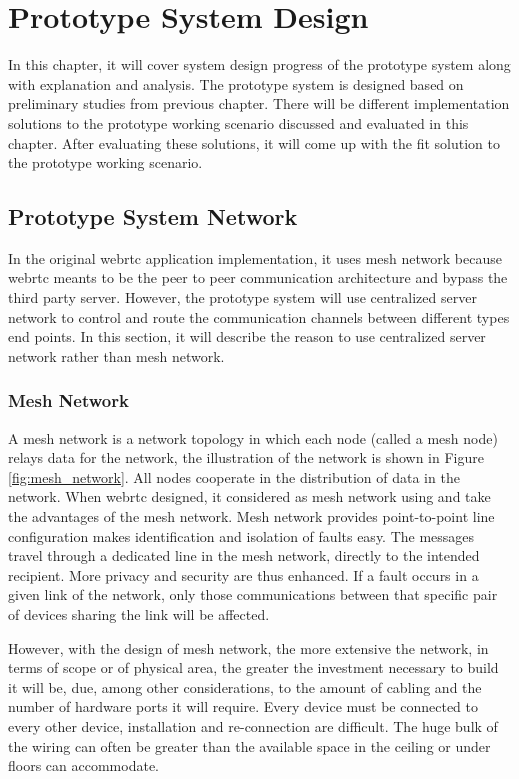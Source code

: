\chapter{Prototype System Design}
\label{chp:sys_design}

\noindent In this chapter, it will cover system design progress of the prototype system along with explanation and analysis. The prototype system is designed based on preliminary studies from previous chapter. There will be different implementation solutions to the prototype working scenario discussed and evaluated in this chapter. After evaluating these solutions, it will come up with the fit solution to the prototype working scenario. 

\section{Prototype System Network}

\noindent In the original \gls{webrtc} application implementation, it uses mesh network because \gls{webrtc} meants to be the peer to peer communication architecture and bypass the third party server. However, the prototype system will use centralized server network to control and route the communication channels between different types end points. In this section, it will describe the reason to use centralized server network rather than mesh network.

\subsection{Mesh Network}

\par A mesh network is a network topology in which each node (called a mesh node) relays data for the network, the illustration of the network is shown in Figure \ref{fig:mesh_network}. All nodes cooperate in the distribution of data in the network. When \gls{webrtc} designed, it considered as mesh network using and take the advantages of the mesh network. Mesh network provides point-to-point line configuration makes identification and isolation of faults easy. The messages travel through a dedicated line in the mesh network, directly to the intended recipient. More privacy and security are thus enhanced. If a fault occurs in a given link of the network, only those communications between that specific pair of devices sharing the link will be affected.\cite{wiki:mesh_network}

\par However, with the design of mesh network, the more extensive the network, in terms of scope or of physical area, the greater the investment necessary to build it will be, due, among other considerations, to the amount of cabling and the number of hardware ports it will require. Every device must be connected to every other device, installation and re-connection are difficult. The huge bulk of the wiring can often be greater than the available space in the ceiling or under floors can accommodate.

